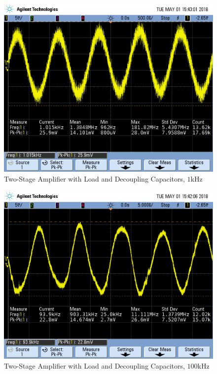 \begin{figure}[h!]
	\centering
	\includegraphics[scale=0.45]{./images/SCOPE_18.PNG}
	\caption{Two-Stage Amplifier with Load and Decoupling Capacitors, $1$\si{\kilo\hertz}}
	\label{fig:SCOPE_18}
\end{figure}

\FloatBarrier

\FloatBarrier

\begin{figure}[h!]
	\centering
	\includegraphics[scale=0.45]{./images/SCOPE_17.PNG}
	\caption{Two-Stage Amplifier with Load and Decoupling Capacitors, $100$\si{\kilo\hertz}}
	\label{fig:SCOPE_17}
\end{figure}

